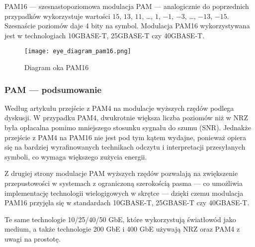 PAM16 --- szesnastopoziomowa modulacja PAM --- analogicznie do poprzednich przypadków wykorzystuje wartości $15$, $13$, $11$, \dots , $1$, $-1$, $-3$, \dots , $-13$, $-15$. Szesnaście poziomów daje 4 bity na symbol.
Modulacja PAM16 wykorzystywana jest w technologiach 10GBASE-T, 25GBASE-T czy 40GBASE-T.

\begin{figure}[ht]
    \centering
    \texttt{[image: eye\_diagram\_pam16.png]}
    \caption{Diagram oka PAM16}
    \label{fig:diagram_oka_pam16}
\end{figure}

\subsubsection{PAM --- podsumowanie}

Według artykułu \cite{Higher-order-modulation} przejście z PAM4 na modulacje wyższych rzędów podlega dyskusji. W przypadku PAM4, dwukrotnie większa liczba
poziomów niż w NRZ była opłacalna pomimo mniejszego stosunku sygnału do szumu (SNR). Jednakże przejście z PAM4 na PAM16 nie jest pod tym kątem wydajne, ponieważ
opiera się na bardziej wyrafinowanych technikach odczytu i interpretacji przesyłanych symboli, co wymaga większego zużycia energii.

Z drugiej strony modulacje PAM wyższych rzędów pozwalają na zwiększenie przepustowości w systemach z ograniczoną szerokością pasma --- co
umożliwia implementację technologii wielogigowych w skrętce --- dzięki czemu modulacja PAM16 przyjęła się w standardach 10GBASE-T, 25GBASE-T czy 40GBASE-T.

Te same technologie 10/25/40/50 GbE, które wykorzystują światłowód jako medium, a także technologie 200 GbE i 400 GbE używają NRZ oraz PAM4 z uwagi na prostotę.

